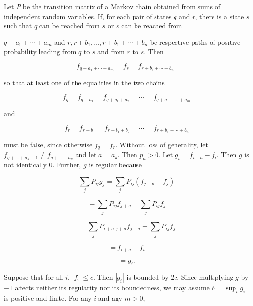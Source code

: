 Let $P$ be the transition matrix of a Markov chain obtained from sums of independent random variables. If, for each pair of states $q$ and $r$, there is a state $s$ such that $q$ can be reached from $s$ or $s$ can be reached from

$q + a_1 + \cdots + a_m$ and $r, r + b_1, \ldots, r + b_1 + \cdots + b_n$ be respective paths of positive probability leading from $q$ to $s$ and from $r$ to $s$. Then

$$f_{q+a_1+\cdots+a_m} = f_s = f_{r+b_1+\cdots+b_n},$$

so that at least one of the equalities in the two chains

$$f_q = f_{q+a_1} = f_{q+a_1+a_2} = \cdots = f_{q+a_1+\cdots+a_m}$$

and

$$f_r = f_{r+b_1} = f_{r+b_1+b_2} = \cdots = f_{r+b_1+\cdots+b_n}$$

must be false, since otherwise $f_q = f_r$. Without loss of generality, let $f_{q+\cdots+a_k-1} \neq f_{q+\cdots+a_k}$ and let $a = a_k$. Then $p_a > 0$. Let $g_i = f_{i+a} - f_i$. Then $g$ is not identically 0. Further, $g$ is regular because

$$\sum_j P_{ij} g_j = \sum_j P_{ij}(f_{j+a} - f_j)$$

$$= \sum_j P_{ij} f_{j+a} - \sum_j P_{ij} f_j$$

$$= \sum_j P_{i+a,j+a} f_{j+a} - \sum_j P_{ij} f_j$$

$$= f_{i+a} - f_i$$

$$= g_i.$$

Suppose that for all $i$, $|f_i| \leq c$. Then $|g_i|$ is bounded by 2$c$. Since multiplying $g$ by $-1$ affects neither its regularity nor its boundedness, we may assume $b = \sup_i g_i$ is positive and finite. For any $i$ and any $m > 0$,
